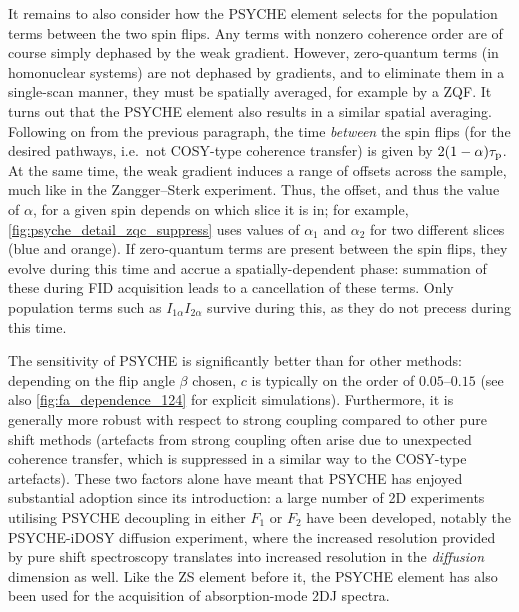It remains to also consider how the PSYCHE element selects for the population terms between the two spin flips.
Any terms with nonzero coherence order are of course simply dephased by the weak gradient.
However, zero-quantum terms (in homonuclear systems) are not dephased by gradients, and to eliminate them in a single-scan manner, they must be spatially averaged, for example by a ZQF.
It turns out that the PSYCHE element also results in a similar spatial averaging.
Following on from the previous paragraph, the time \textit{between} the spin flips (for the desired pathways, i.e.\ not COSY-type coherence transfer) is given by $2(1 - \alpha)\tau_\mathrm{p}$.
At the same time, the weak gradient induces a range of offsets across the sample, much like in the Zangger--Sterk experiment.
Thus, the offset, and thus the value of $\alpha$, for a given spin depends on which slice it is in; for example, \cref{fig:psyche_detail_zqc_suppress} uses values of $\alpha_1$ and $\alpha_2$ for two different slices (blue and orange).
If zero-quantum terms are present between the spin flips, they evolve during this time and accrue a spatially-dependent phase: summation of these during FID acquisition leads to a cancellation of these terms.
Only population terms such as $I_{1\alpha}I_{2\alpha}$ survive during this, as they do not precess during this time.

The sensitivity of PSYCHE is significantly better than for other methods: depending on the flip angle $\beta$ chosen, $c$ is typically on the order of $0.05$--$0.15$ (see also \cref{fig:fa_dependence_124} for explicit simulations).
Furthermore, it is generally more robust with respect to strong coupling compared to other pure shift methods (artefacts from strong coupling often arise due to unexpected coherence transfer\autocite{Thrippleton2005JMR}, which is suppressed in a similar way to the COSY-type artefacts).
These two factors alone have meant that PSYCHE has enjoyed substantial adoption since its introduction: a large number of 2D experiments utilising PSYCHE decoupling in either $F_1$ or $F_2$ have been developed,\autocite{Foroozandeh2014JACS,Timari2015CEJ,Koos2016ACIE,Sinnaeve2016ACIE,Aguilar2018MRC,Kaltschnee2016JMR,Ilgen2021JMR} notably the PSYCHE-iDOSY diffusion experiment\autocite{Foroozandeh2016ACIE}, where the increased resolution provided by pure shift spectroscopy translates into increased resolution in the \textit{diffusion} dimension as well.
Like the ZS element before it, the PSYCHE element has also been used for the acquisition of absorption-mode 2DJ spectra.\autocite{Foroozandeh2015CC}

